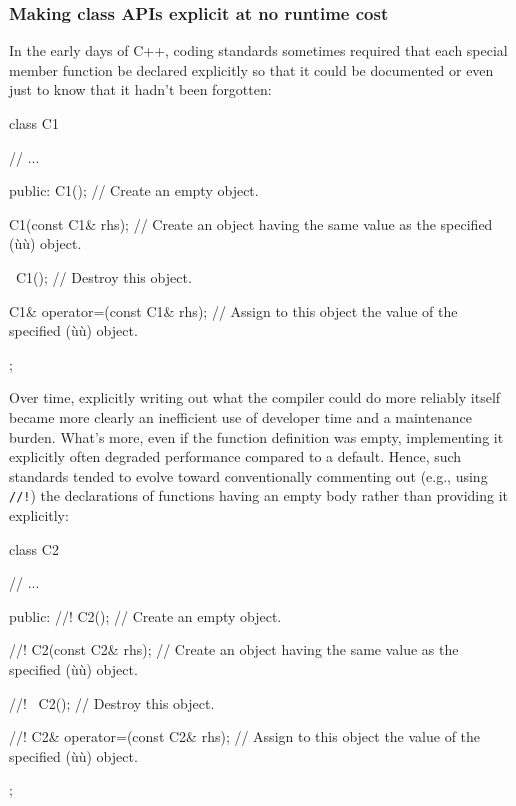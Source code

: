 \subsubsection[Making class APIs explicit at no runtime cost]{Making class APIs explicit at no runtime cost}\label{making-class-apis-explicit-at-no-runtime-cost}

In the early days of C++, coding standards sometimes
required that each special member function be declared explicitly so
that it could be documented or even just to know that it hadn't been
forgotten:

\begin{emcppslisting}[language=C++]
class C1
{
     // ...

public:
   C1();
       // Create an empty object.

   C1(const C1& rhs);
       // Create an object having the same value as the specified (ù{}ù) object.

   ~C1();
       // Destroy this object.

   C1& operator=(const C1& rhs);
       // Assign to this object the value of the specified (ù{}ù) object.
};
\end{emcppslisting}

\noindent Over time, explicitly writing out what the compiler
could do more reliably itself became more clearly an inefficient use of developer time and a maintenance burden.
What's more, even if the function definition was empty, implementing it
explicitly often degraded performance compared to a  default. Hence, such
standards tended to evolve toward conventionally commenting out (e.g.,
using \lstinline|//!|)
the declarations of functions having an empty
body rather than providing it explicitly:

\begin{emcppslisting}[language=C++]
class C2
{
     // ...

public:
   //! C2();
       // Create an empty object.

   //! C2(const C2& rhs);
       // Create an object having the same value as the specified (ù{}ù) object.

   //! ~C2();
       // Destroy this object.

   //! C2& operator=(const C2& rhs);
       // Assign to this object the value of the specified (ù{}ù) object.
};
\end{emcppslisting}

